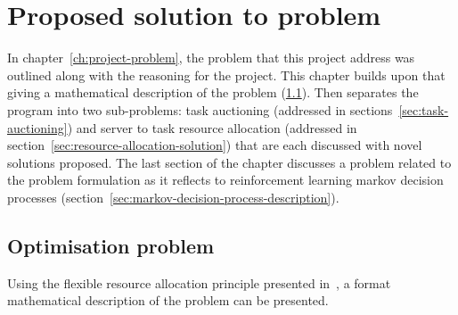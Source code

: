 \chapter{Proposed solution to problem}\label{ch:proposed-solution-to-problem}
In chapter~\ref{ch:project-problem}, the problem that this project address was outlined along with the reasoning for the
project. This chapter builds upon that giving a mathematical description of the problem (\ref{sec:optimisation-problem}).
Then separates the program into two sub-problems: task auctioning (addressed in sections~\ref{sec:task-auctioning})
and server to task resource allocation (addressed in section~\ref{sec:resource-allocation-solution}) that are each
discussed with novel solutions proposed. The last section of the chapter discusses a problem related to the problem
formulation as it reflects to reinforcement learning markov decision processes
(section~\ref{sec:markov-decision-process-description}).

\section{Optimisation problem}\label{sec:optimisation-problem}

Using the flexible resource allocation principle presented in~\cite{FlexibleResourceAllocation}, a format mathematical
description of the problem can be presented.


